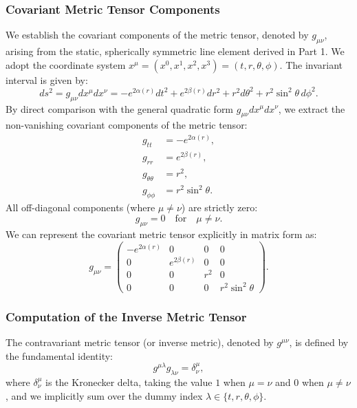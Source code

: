 \documentclass[11pt, a4paper]{report}
\begin{document}
\subsubsection{Covariant Metric Tensor Components}
We establish the covariant components of the metric tensor, denoted by $g_{\mu\nu}$, arising from the static, spherically symmetric line element derived in Part 1. We adopt the coordinate system $x^\mu = (x^0, x^1, x^2, x^3) = (t, r, \theta, \phi)$. The invariant interval is given by:
\begin{equation}
ds^2 = g_{\mu\nu} dx^\mu dx^\nu = -e^{2\alpha(r)} dt^2 + e^{2\beta(r)} dr^2 + r^2 d\theta^2 + r^2 \sin^2\theta \, d\phi^2.
\end{equation}
By direct comparison with the general quadratic form $g_{\mu\nu} dx^\mu dx^\nu$, we extract the non-vanishing covariant components of the metric tensor:
\begin{align}
g_{tt} &= -e^{2\alpha(r)}, \\
g_{rr} &= e^{2\beta(r)}, \\
g_{\theta\theta} &= r^2, \\
g_{\phi\phi} &= r^2 \sin^2\theta.
\end{align}
All off-diagonal components (where $\mu \neq \nu$) are strictly zero:
\begin{equation}
g_{\mu\nu} = 0 \quad \text{for} \quad \mu \neq \nu.
\end{equation}
We can represent the covariant metric tensor explicitly in matrix form as:
\begin{equation}
g_{\mu\nu} = \begin{pmatrix}
-e^{2\alpha(r)} & 0 & 0 & 0 \\
0 & e^{2\beta(r)} & 0 & 0 \\
0 & 0 & r^2 & 0 \\
0 & 0 & 0 & r^2 \sin^2\theta
\end{pmatrix}.
\end{equation}

\subsubsection{Computation of the Inverse Metric Tensor}
The contravariant metric tensor (or inverse metric), denoted by $g^{\mu\nu}$, is defined by the fundamental identity:
\begin{equation}
g^{\mu\lambda} g_{\lambda\nu} = \delta^\mu_\nu,
\end{equation}
where $\delta^\mu_\nu$ is the Kronecker delta, taking the value $1$ when $\mu = \nu$ and $0$ when $\mu \neq \nu$, and we implicitly sum over the dummy index $\lambda \in \{t, r, \theta, \phi\}$.
\end{document}
